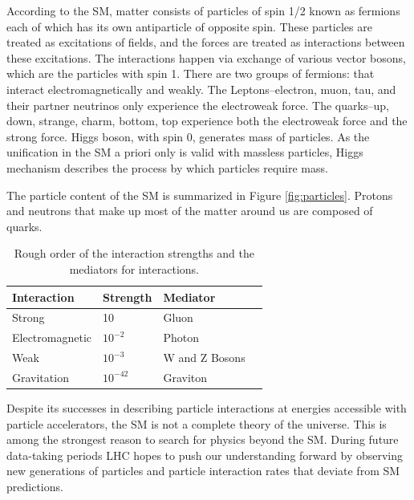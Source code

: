 According to the SM, matter consists of particles of spin 1/2 known as fermions each of which has its own antiparticle of opposite spin. These particles are treated as excitations of fields, and the forces are treated as interactions between these excitations. The interactions happen via exchange of various vector bosons, which are the particles with spin 1. There are two groups of fermions: that interact electromagnetically and weakly. The Leptons--electron, muon, tau, and their partner neutrinos only experience the electroweak force. The quarks--up, down, strange, charm, bottom, top experience both the electroweak force and the strong force. Higgs boson, with spin 0, generates mass of particles. As the unification in the SM a priori only is valid with massless particles, Higgs mechanism describes the process by which particles require mass. 


The particle content of the SM is summarized in Figure \ref{fig:particles}. Protons and neutrons that make up most of the matter around us are composed of quarks.  

\begin{table}
\begin{center}
    \begin{tabular}{| l | l | l | l |}
    \hline
    {\bf Interaction} & {\bf Strength} & {\bf Mediator} \\ \hline
    Strong & 10  & Gluon \\ \hline
    Electromagnetic & $10^{-2}$  & Photon \\ \hline
    Weak & $10^{-3}$ &   W and Z Bosons\\ \hline
    Gravitation & $10^{-42}$  & Graviton \\
    \hline
    \end{tabular}
	\captionsetup{format=hang}    
     \caption{Rough order of the interaction strengths and the mediators for interactions.}

\end{center}
\end{table}



Despite its successes in describing particle interactions at energies accessible with particle accelerators, the SM is not a complete theory of the universe. This is among the strongest reason to search for physics beyond the SM. During future data-taking periods LHC hopes to push our understanding forward by observing new generations of particles and particle interaction rates that deviate from SM predictions.

